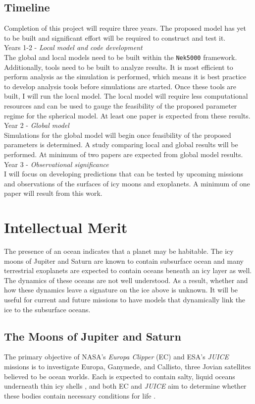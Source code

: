\documentclass[12pt]{article}
\begin{document}
 \subsection{Timeline}
 Completion of this project will require three years. The proposed model has yet to be built and significant effort will be required to construct and test it.\\
 Years 1-2 - \textit{Local model and code development}\\
 The global and local models need to be built within the \texttt{Nek5000} framework. Additionally, tools need to be built to analyze results. It is most efficient to perform analysis as the simulation is performed, which means it is best practice to develop analysis tools before simulations are started. Once these tools are built, I will run the local model.
 The local model will require less computational resources and can be used to gauge the feasibility of the proposed parameter regime for the spherical model. At least one paper is expected from these results.\\
 Year 2 - \textit{Global model}\\
  Simulations for the global model will begin once feasibility of the proposed parameters is determined. A study comparing local and global results will be performed. At minimum of two papers are expected from global model results. \\
 Year 3 -  \textit{Observational significance}\\ I will focus on developing predictions that can be tested by upcoming missions and observations of the surfaces of icy moons and exoplanets. A minimum of one paper will result from this work.

\section{Intellectual Merit}
The presence of an ocean indicates that a planet may be habitable\citep{tB24}. The icy moons of Jupiter and Saturn are known to contain subsurface ocean and many terrestrial exoplanets are expected to contain oceans beneath an icy layer as well\citep{lQ20}. The dynamics of these oceans are not well understood. As a result, whether and how these dynamics leave a signature on the ice above is unknown. It will be useful for current and future missions to have models that dynamically link the ice to the subsurface oceans.

\subsection{The Moons of Jupiter and Saturn}
The primary objective of NASA's \textit{Europa Clipper} (EC)\cite{pC14_EC} and ESA's \textit{JUICE} \citep{oG13} missions is to investigate Europa, Ganymede, and Callisto, three Jovian satellites believed to be ocean worlds. Each is expected to contain salty, liquid oceans underneath thin icy shells \citep{rP99,fN16}, and both EC and \textit{JUICE} aim to determine whether these bodies contain necessary conditions for life \citep{tB24}. 
\end{document}
